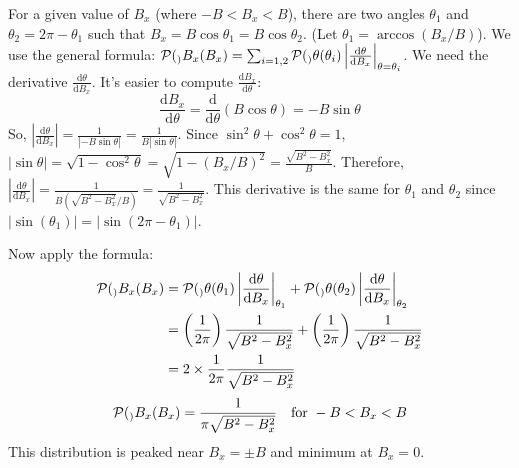 \documentclass[11pt]{article}
\newcommand{\ProbDens}[1]{\mathcal{P}(#1)} %
\newcommand{\deriv}[2]{\frac{\mathrm{d} #1}{\mathrm{d} #2}}
\begin{document}
For a given value of $B_x$ (where $-B < B_x < B$), there are two angles $\theta_1$ and $\theta_2 = 2\pi - \theta_1$ such that $B_x = B \cos \theta_1 = B \cos \theta_2$. (Let $\theta_1 = \arccos(B_x/B)$).
We use the general formula: $\ProbDens_{B_x}(B_x) = \sum_{i=1,2} \ProbDens_\theta(\theta_i) \left| \deriv{\theta}{B_x} \right|_{\theta=\theta_i}$.
We need the derivative $\deriv{\theta}{B_x}$. It's easier to compute $\deriv{B_x}{\theta}$:
\[ \deriv{B_x}{\theta} = \deriv{}{ \theta} (B \cos \theta) = -B \sin \theta \]
So, $\left| \deriv{\theta}{B_x} \right| = \frac{1}{|-B \sin \theta|} = \frac{1}{B |\sin \theta|}$.
Since $\sin^2\theta + \cos^2\theta = 1$, $|\sin \theta| = \sqrt{1-\cos^2\theta} = \sqrt{1-(B_x/B)^2} = \frac{\sqrt{B^2-B_x^2}}{B}$.
Therefore, $\left| \deriv{\theta}{B_x} \right| = \frac{1}{B (\sqrt{B^2-B_x^2}/B)} = \frac{1}{\sqrt{B^2-B_x^2}}$.
This derivative is the same for $\theta_1$ and $\theta_2$ since $|\sin(\theta_1)| = |\sin(2\pi-\theta_1)|$.

Now apply the formula:
\begin{align*} \ProbDens_{B_x}(B_x) &= \ProbDens_\theta(\theta_1) \left| \deriv{\theta}{B_x} \right|_{\theta_1} + \ProbDens_\theta(\theta_2) \left| \deriv{\theta}{B_x} \right|_{\theta_2} \\ &= \left( \frac{1}{2\pi} \right) \frac{1}{\sqrt{B^2-B_x^2}} + \left( \frac{1}{2\pi} \right) \frac{1}{\sqrt{B^2-B_x^2}} \\ &= 2 \times \frac{1}{2\pi} \frac{1}{\sqrt{B^2-B_x^2}} \end{align*}
\[ \ProbDens_{B_x}(B_x) = \frac{1}{\pi \sqrt{B^2 - B_x^2}} \quad \text{for } -B < B_x < B \]
This distribution is peaked near $B_x = \pm B$ and minimum at $B_x = 0$.

\begin{center}
\end{center}
\end{document}
